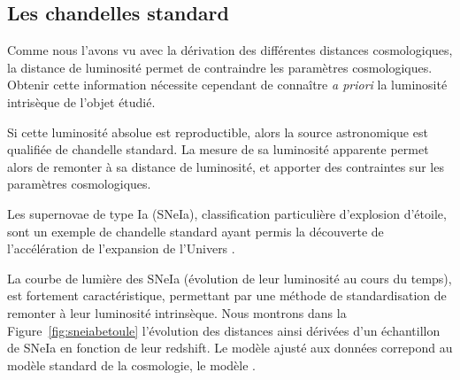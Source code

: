 \documentclass[../main/main.tex]{subfiles}
\begin{document}
\subsection{Les chandelles standard}

Comme nous l'avons vu avec la dérivation des différentes distances
cosmologiques, la distance de luminosité permet de contraindre les
paramètres cosmologiques. Obtenir cette information nécessite cependant
de connaître \textit{a
  priori} la luminosité intrisèque de l'objet étudié.

Si cette luminosité absolue est reproductible, alors la source
astronomique est qualifiée de chandelle standard. La mesure de sa
luminosité apparente permet alors de remonter à sa distance de luminosité, et apporter des
contraintes sur les paramètres cosmologiques. 

Les supernovae de type Ia (SNeIa), classification particulière d'explosion
d'étoile, sont un exemple de chandelle standard ayant permis la
découverte de l'accélération de l'expansion de l'Univers
\citep{Riess1998, Perlmutter1999}.

La courbe de lumière des SNeIa (évolution de leur luminosité au cours du
temps), est fortement caractéristique, permettant par une méthode de
standardisation de remonter à leur luminosité intrinsèque. Nous montrons
dans la Figure~\ref{fig:sneiabetoule} l'évolution des distances ainsi dérivées d'un échantillon de SNeIa en
fonction de leur redshift. Le modèle ajusté aux données correpond au
modèle standard de la cosmologie, le modèle \lcdm.
\end{document}
